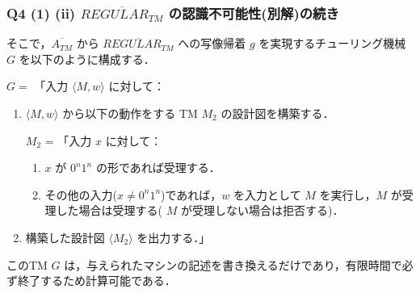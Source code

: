 \begin{frame}[fragile]
\frametitle{Q4 (1) \hspace{3mm} (ii) $\overline{REGULAR_{TM}}$ の認識不可能性(別解)の続き}

そこで，$\overline{A_{TM}}$ から $\overline{REGULAR_{TM}}$ への写像帰着 $g$ を実現するチューリング機械 $G$ を以下のように構成する．

$G =$ 「入力 $\langle M, w \rangle$ に対して：

\begin{enumerate}
    \item $\langle M, w \rangle$ から以下の動作をする TM $M_{2}$ の設計図を構築する．

     $M_{2}$ = 「入力 $x$ に対して：

\begin{enumerate}
  \item[1.] $x$ が $0^{n}1^{n}$ の形であれば受理する．

  \item[2.] その他の入力($x \neq 0^{n}1^{n}$)であれば，$w$ を入力として $M$ を実行し，$M$ が受理した場合は受理する( $M$ が受理しない場合は拒否する)．
\end{enumerate}

    \item 構築した設計図 $\langle M_{2} \rangle$ を出力する．」
\end{enumerate}

このTM $G$ は，与えられたマシンの記述を書き換えるだけであり，有限時間で必ず終了するため計算可能である．

\end{frame}



